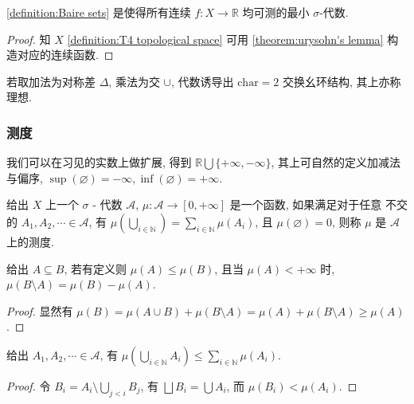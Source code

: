 \begin{lemma}
    \ref{definition:Baire sets} 是使得所有连续 \(f:X \to \mathbb{R}\) 均可测的最小 \(\sigma\)-代数.

    \begin{proof}
        知 \(X\) \ref{definition:T4 topological space} 可用 \ref{theorem:urysohn's lemma} 构造对应的连续函数.
    \end{proof}
\end{lemma}

\begin{remark}
    若取加法为对称差 \(\Delta\), 乘法为交 \(\cup\), 代数诱导出 \(\mathrm{char} = 2\) 交换幺环结构, 其上亦称理想.
\end{remark}

\subsubsection{测度}

我们可以在习见的实数上做扩展, 得到 \(\mathbb{R} \bigcup \{+\infty,-\infty\}\),
其上可自然的定义加减法与偏序, \(\sup (\varnothing) = - \infty,\inf (\varnothing) = + \infty\).

\begin{definition}
    给出 \(X\) 上一个 \(\sigma\) - 代数 \(\mathcal{A}\), \(\mu: \mathcal{A} \to [0, +\infty]\) 是一个函数, 如果满足对于任意
    不交的 \(A_1, A_2, \cdots \in \mathcal{A}\), 有 \(\mu(\bigcup_{i \in \mathbb{N}}) = \sum_{i \in \mathbb{N}} \mu(A_i)\),
    且 \(\mu(\varnothing) = 0\), 则称 \(\mu\) 是 \(\mathcal{A}\) 上的测度.
\end{definition}

\begin{corollary}
    给出 \(A \subseteq B\), 若有定义则 \(\mu(A) \leq \mu(B)\), 且当 \(\mu (A) < +\infty\) 时, \(\mu(B \setminus A) = \mu(B) - \mu(A)\).

    \begin{proof}
        显然有 \(\mu(B) = \mu(A \cup B) + \mu(B \setminus A) = \mu(A) + \mu(B \setminus A) \geq \mu(A)\).
    \end{proof}
\end{corollary}

\begin{corollary}
    给出 \(A_1, A_2, \cdots \in \mathcal{A}\), 有 \(\mu(\bigcup_{i \in \mathbb{N}} A_i) \leq \sum_{i \in \mathbb{N}} \mu(A_i)\).

    \begin{proof}
        令 \(B_i = A_i \setminus \bigcup_{j<i} B_j\), 有 \(\bigsqcup B_i = \bigcup A_i\), 而 \(\mu (B_i) < \mu (A_i)\).
    \end{proof}
\end{corollary}

